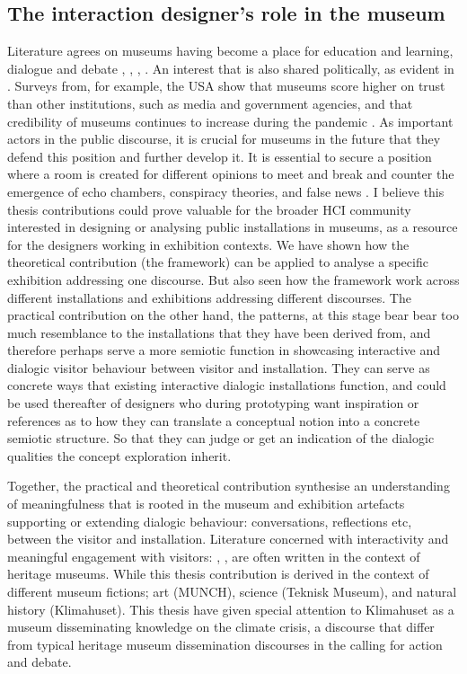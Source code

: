 \subsection{The interaction designer's role in the museum}
Literature agrees on museums having become a place for education and learning, dialogue and debate \autocite{narrative_sitzia}, \autocite{hein_1998}, \autocite{hooper_1994}, \autocite{Roberts_1997}. An interest that is also shared politically, as evident in \autocite{melding23}. Surveys from, for example, the USA show that museums score higher on trust than other institutions, such as media and government agencies, and that credibility of museums continues to increase during the pandemic \autocite{impact_2020}. As important actors in the public discourse, it is crucial for museums in the future that they defend this position and further develop it. It is essential to secure a position where a room is created for different opinions to meet and break and counter the emergence of echo chambers, conspiracy theories, and false news \autocite[p. 41]{melding23}. 
I believe this thesis contributions could prove valuable for the broader HCI community interested in designing or analysing public installations in museums, as a resource for the designers working in exhibition contexts. We have shown how the theoretical contribution (the framework) can be applied to analyse a specific exhibition addressing one discourse. But also seen how the framework work across different installations and exhibitions addressing different discourses. The practical contribution on the other hand, the patterns, at this stage bear bear too much resemblance to the installations that they have been derived from, and therefore perhaps serve a more semiotic function in showcasing interactive and dialogic visitor behaviour between visitor and installation. They can serve as concrete ways that existing interactive dialogic installations function, and could be used thereafter of designers who during prototyping want inspiration or references as to how they can translate a conceptual notion into a concrete semiotic structure. So that they can judge or get an indication of the dialogic qualities the concept exploration inherit. 

Together, the practical and theoretical contribution synthesise an understanding of meaningfulness that is rooted in the museum and exhibition artefacts supporting or extending dialogic behaviour: conversations, reflections etc, between the visitor and installation. Literature concerned with interactivity and meaningful engagement with visitors: \autocite{mccarthy_place}, \autocite{ciolfi_designing_2012}, are often written in the context of heritage museums. While this thesis contribution is derived in the context of different museum fictions; art (MUNCH), science (Teknisk Museum), and natural history (Klimahuset). This thesis have given special attention to Klimahuset as a museum disseminating knowledge on the climate crisis, a discourse that differ from typical heritage museum dissemination discourses in the calling for action and debate. 



